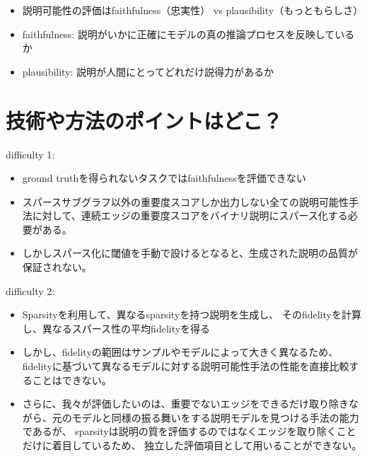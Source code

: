 \documentclass[a4paper,10pt]{ltjsarticle}
\newcommand{\1}{\mbox{1}\hspace{-0.25em}\mbox{l}}
\theoremstyle{definition}
\begin{document}
    \begin{itemize}
        \item 説明可能性の評価はfaithfulness（忠実性） vs plausibility（もっともらしさ）
        \item faithfulness: 説明がいかに正確にモデルの真の推論プロセスを反映しているか
        \item plausibility: 説明が人間にとってどれだけ説得力があるか
    \end{itemize}


    \section{技術や方法のポイントはどこ？}
    difficulty 1:
    \begin{itemize}
        \item ground truthを得られないタスクではfaithfulnessを評価できない
        \item スパースサブグラフ以外の重要度スコアしか出力しない全ての説明可能性手法に対して、連続エッジの重要度スコアをバイナリ説明にスパース化する必要がある。
        \item しかしスパース化に閾値を手動で設けるとなると、生成された説明の品質が保証されない。
    \end{itemize}

    difficulty 2:
    \begin{itemize}
        \item Sparsityを利用して、異なるsparsityを持つ説明を生成し、
        そのfidelityを計算し、異なるスパース性の平均fidelityを得る
        \item しかし、fidelityの範囲はサンプルやモデルによって大きく異なるため、
        fidelityに基づいて異なるモデルに対する説明可能性手法の性能を直接比較することはできない。
        \item さらに、我々が評価したいのは、重要でないエッジをできるだけ取り除きながら、元のモデルと同様の振る舞いをする説明モデルを見つける手法の能力であるが、
        sparsityは説明の質を評価するのではなくエッジを取り除くことだけに着目しているため、
        独立した評価項目として用いることができない。
    \end{itemize}
\end{document}
